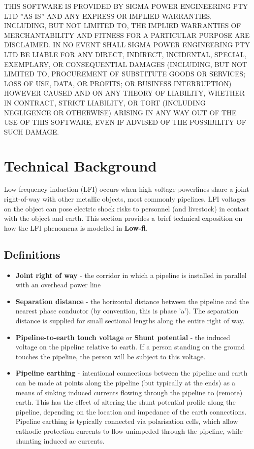 \documentclass{article}
\begin{document}
THIS SOFTWARE IS PROVIDED BY SIGMA POWER ENGINEERING PTY LTD ''AS IS'' AND ANY
EXPRESS OR IMPLIED WARRANTIES, INCLUDING, BUT NOT LIMITED TO, THE IMPLIED
WARRANTIES OF MERCHANTABILITY AND FITNESS FOR A PARTICULAR PURPOSE ARE
DISCLAIMED. IN NO EVENT SHALL SIGMA POWER ENGINEERING PTY LTD BE LIABLE FOR ANY
DIRECT, INDIRECT, INCIDENTAL, SPECIAL, EXEMPLARY, OR CONSEQUENTIAL DAMAGES
(INCLUDING, BUT NOT LIMITED TO, PROCUREMENT OF SUBSTITUTE GOODS OR SERVICES;
LOSS OF USE, DATA, OR PROFITS; OR BUSINESS INTERRUPTION) HOWEVER CAUSED AND
ON ANY THEORY OF LIABILITY, WHETHER IN CONTRACT, STRICT LIABILITY, OR TORT
(INCLUDING NEGLIGENCE OR OTHERWISE) ARISING IN ANY WAY OUT OF THE USE OF THIS
SOFTWARE, EVEN IF ADVISED OF THE POSSIBILITY OF SUCH DAMAGE.

\newpage
\section{Technical Background}

Low frequency induction (LFI) occurs when high voltage powerlines share a joint right-of-way with other metallic objects, most commonly pipelines. LFI voltages on the object can pose electric shock risks to personnel (and livestock) in contact with the object and earth. This section provides a brief technical exposition on how the LFI phenomena is modelled in \textbf{Low-fi}. 

\subsection{Definitions}

\begin{itemize}
\item \textbf{Joint right of way} - the corridor in which a pipeline is installed in parallel with an overhead power line
\item \textbf{Separation distance} - the horizontal distance between the pipeline and the nearest phase conductor (by convention, this is phase 'a'). The separation distance is supplied for small sectional lengths along the entire right of way.
\item \textbf{Pipeline-to-earth touch voltage} or \textbf{Shunt potential} - the induced voltage on the pipeline relative to earth. If a person standing on the ground touches the pipeline, the person will be subject to this voltage. 
\item \textbf{Pipeline earthing} - intentional connections between the pipeline and earth can be made at points along the pipeline (but typically at the ends) as a means of sinking induced currents flowing through the pipeline to (remote) earth. This has the effect of altering the shunt potential profile along the pipeline, depending on the location and impedance of the earth connections. Pipeline earthing is typically connected via polarisation cells, which allow cathodic protection currents to flow unimpeded through the pipeline, while shunting induced ac currents.
\end{itemize}
\end{document}
